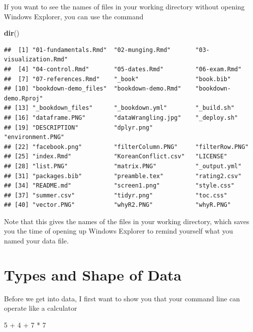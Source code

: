 \documentclass[]{book}
\newenvironment{Shaded}{\begin{snugshade}}{\end{snugshade}}
\newcommand{\KeywordTok}[1]{\textcolor[rgb]{0.13,0.29,0.53}{\textbf{{#1}}}}
\newcommand{\DecValTok}[1]{\textcolor[rgb]{0.00,0.00,0.81}{{#1}}}
\newcommand{\StringTok}[1]{\textcolor[rgb]{0.31,0.60,0.02}{{#1}}}
\newcommand{\NormalTok}[1]{{#1}}
\begin{document}
If you want to see the names of files in your working directory without
opening Windows Explorer, you can use the command

\begin{Shaded}
\begin{Highlighting}[]
\KeywordTok{dir}\NormalTok{()}
\end{Highlighting}
\end{Shaded}

\begin{verbatim}
##  [1] "01-fundamentals.Rmd"  "02-munging.Rmd"       "03-visualization.Rmd"
##  [4] "04-control.Rmd"       "05-dates.Rmd"         "06-exam.Rmd"         
##  [7] "07-references.Rmd"    "_book"                "book.bib"            
## [10] "bookdown-demo_files"  "bookdown-demo.Rmd"    "bookdown-demo.Rproj" 
## [13] "_bookdown_files"      "_bookdown.yml"        "_build.sh"           
## [16] "dataframe.PNG"        "dataWrangling.jpg"    "_deploy.sh"          
## [19] "DESCRIPTION"          "dplyr.png"            "environment.PNG"     
## [22] "facebook.png"         "filterColumn.PNG"     "filterRow.PNG"       
## [25] "index.Rmd"            "KoreanConflict.csv"   "LICENSE"             
## [28] "list.PNG"             "matrix.PNG"           "_output.yml"         
## [31] "packages.bib"         "preamble.tex"         "rating2.csv"         
## [34] "README.md"            "screen1.png"          "style.css"           
## [37] "summer.csv"           "tidyr.png"            "toc.css"             
## [40] "vector.PNG"           "whyR2.PNG"            "whyR.PNG"
\end{verbatim}

Note that this gives the names of the files in your working directory,
which saves you the time of opening up Windows Explorer to remind
yourself what you named your data file.

\section{Types and Shape of Data}\label{types-and-shape-of-data}

Before we get into data, I first want to show you that your command line
can operate like a calculator

\begin{Shaded}
\begin{Highlighting}[]
\DecValTok{5} \NormalTok{+}\StringTok{ }\DecValTok{4} \NormalTok{+}\StringTok{ }\DecValTok{7} \NormalTok{*}\StringTok{ }\DecValTok{7}
\end{Highlighting}
\end{Shaded}
\end{document}
